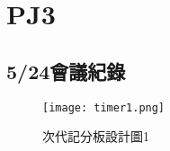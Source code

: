 \chapter{PJ3}


\section{5/24會議紀錄}


\begin{figure}
  \centering
  \texttt{[image: timer1.png]}
  \caption{次代記分板設計圖1}
  \label{fig:example}
\end{figure}